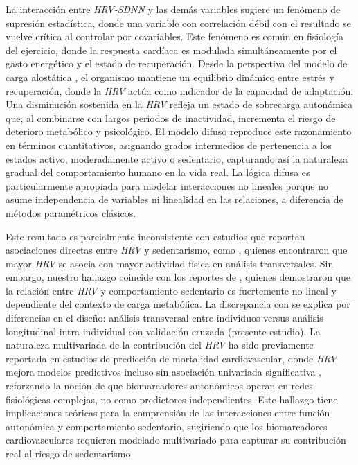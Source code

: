 La interacción entre \textit{HRV-SDNN} y las demás variables sugiere un fenómeno de supresión estadística, donde una variable con correlación débil con el resultado se vuelve crítica al controlar por covariables. Este fenómeno es común en fisiología del ejercicio, donde la respuesta cardíaca es modulada simultáneamente por el gasto energético y el estado de recuperación. Desde la perspectiva del modelo de carga alostática \cite{McEwen2009}, el organismo mantiene un equilibrio dinámico entre estrés y recuperación, donde la \textit{HRV} actúa como indicador de la capacidad de adaptación. Una disminución sostenida en la \textit{HRV} refleja un estado de sobrecarga autonómica que, al combinarse con largos periodos de inactividad, incrementa el riesgo de deterioro metabólico y psicológico. El modelo difuso reproduce este razonamiento en términos cuantitativos, asignando grados intermedios de pertenencia a los estados activo, moderadamente activo o sedentario, capturando así la naturaleza gradual del comportamiento humano en la vida real. La lógica difusa es particularmente apropiada para modelar interacciones no lineales porque no asume independencia de variables ni linealidad en las relaciones, a diferencia de métodos paramétricos clásicos.

Este resultado es parcialmente inconsistente con estudios que reportan asociaciones directas entre \textit{HRV} y sedentarismo, como \cite{Aubert2022GlobalMatrix}, quienes encontraron que mayor \textit{HRV} se asocia con mayor actividad física en análisis transversales. Sin embargo, nuestro hallazgo coincide con los reportes de \cite{Deka2023Nonlinear}, quienes demostraron que la relación entre \textit{HRV} y comportamiento sedentario es fuertemente no lineal y dependiente del contexto de carga metabólica. La discrepancia con \cite{Aubert2022GlobalMatrix} se explica por diferencias en el diseño: análisis transversal entre individuos versus análisis longitudinal intra-individual con validación cruzada (presente estudio). La naturaleza multivariada de la contribución del \textit{HRV} ha sido previamente reportada en estudios de predicción de mortalidad cardiovascular, donde \textit{HRV} mejora modelos predictivos incluso sin asociación univariada significativa \cite{Thayer2010MetaAnalysisHRV}, reforzando la noción de que biomarcadores autonómicos operan en redes fisiológicas complejas, no como predictores independientes. Este hallazgo tiene implicaciones teóricas para la comprensión de las interacciones entre función autonómica y comportamiento sedentario, sugiriendo que los biomarcadores cardiovasculares requieren modelado multivariado para capturar su contribución real al riesgo de sedentarismo.


